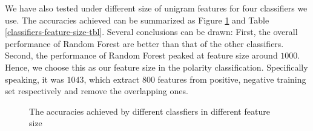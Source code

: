 \documentclass[12pt]{article}
\begin{document}
We have also tested under different size of unigram features for four classifiers we use. The accuracies achieved can be summarized as Figure \ref{classifiers-feature-size} and Table \ref{classifiers-feature-size-tbl}. Several conclusions can be drawn: First, the overall performance of Random Forest are better than that of the other classifiers. Second, the performance of Random Forest peaked at feature size around $1000$. Hence, we choose this as our feature size in the polarity classification. Specifically speaking, it was $1043$, which extract $800$ features from positive, negative training set respectively and remove the overlapping ones.

\begin{figure}
\centering
\caption{The accuracies achieved by different classfiers in different feature size}
\label{classifiers-feature-size}
\end{figure}
\end{document}

